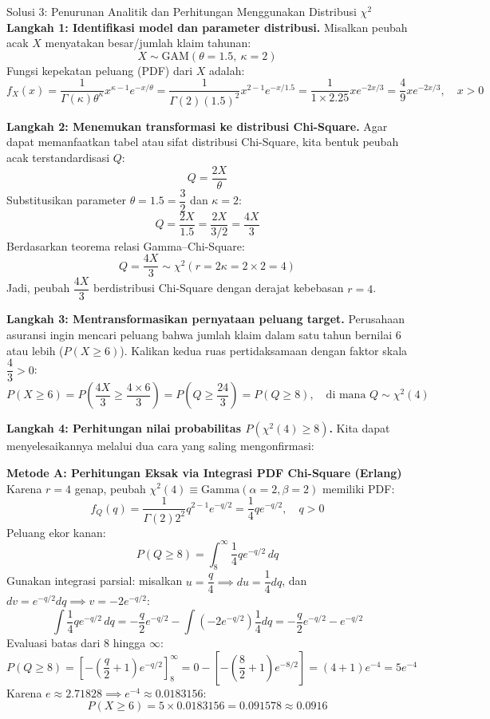 \documentclass[10pt,twoside]{article}
\begin{document}
\begin{solbox}{Solusi 3: Penurunan Analitik dan Perhitungan Menggunakan Distribusi $\chi^2$}
\textbf{Langkah 1: Identifikasi model dan parameter distribusi.}
Misalkan peubah acak $X$ menyatakan besar/jumlah klaim tahunan:
\[
X \sim \text{GAM}(\theta = 1.5, \ \kappa = 2)
\]
Fungsi kepekatan peluang (PDF) dari $X$ adalah:
\[
f_X(x) = \frac{1}{\Gamma(\kappa) \theta^\kappa} x^{\kappa - 1} e^{-x/\theta} = \frac{1}{\Gamma(2) (1.5)^2} x^{2-1} e^{-x/1.5} = \frac{1}{1 \times 2.25} x e^{-2x/3} = \frac{4}{9} x e^{-2x/3}, \quad x > 0
\]

\textbf{Langkah 2: Menemukan transformasi ke distribusi Chi-Square.}
Agar dapat memanfaatkan tabel atau sifat distribusi Chi-Square, kita bentuk peubah acak terstandardisasi $Q$:
\[
Q = \frac{2X}{\theta}
\]
Substitusikan parameter $\theta = 1.5 = \dfrac{3}{2}$ dan $\kappa = 2$:
\[
Q = \frac{2X}{1.5} = \frac{2X}{3/2} = \frac{4X}{3}
\]
Berdasarkan teorema relasi Gamma--Chi-Square:
\[
Q = \frac{4X}{3} \sim \chi^2(r = 2\kappa = 2 \times 2 = 4)
\]
Jadi, peubah $\dfrac{4X}{3}$ berdistribusi Chi-Square dengan derajat kebebasan $r = 4$.

\textbf{Langkah 3: Mentransformasikan pernyataan peluang target.}
Perusahaan asuransi ingin mencari peluang bahwa jumlah klaim dalam satu tahun bernilai 6 atau lebih ($P(X \ge 6)$).
Kalikan kedua ruas pertidaksamaan dengan faktor skala $\dfrac{4}{3} > 0$:
\[
P(X \ge 6) = P\left(\frac{4X}{3} \ge \frac{4 \times 6}{3}\right) = P\left(Q \ge \frac{24}{3}\right) = P(Q \ge 8), \quad \text{di mana } Q \sim \chi^2(4)
\]

\textbf{Langkah 4: Perhitungan nilai probabilitas $P(\chi^2(4) \ge 8)$.}
Kita dapat menyelesaikannya melalui dua cara yang saling mengonfirmasi:

\textbf{Metode A: Perhitungan Eksak via Integrasi PDF Chi-Square (Erlang)}
Karena $r = 4$ genap, peubah $\chi^2(4) \equiv \text{Gamma}(\alpha = 2, \beta = 2)$ memiliki PDF:
\[
f_Q(q) = \frac{1}{\Gamma(2) 2^2} q^{2-1} e^{-q/2} = \frac{1}{4} q e^{-q/2}, \quad q > 0
\]
Peluang ekor kanan:
\[
P(Q \ge 8) = \int_8^\infty \frac{1}{4} q e^{-q/2} \, dq
\]
Gunakan integrasi parsial: misalkan $u = \dfrac{q}{4} \implies du = \dfrac{1}{4} dq$, dan $dv = e^{-q/2} dq \implies v = -2e^{-q/2}$:
\[
\int \frac{1}{4} q e^{-q/2} \, dq = -\frac{q}{2} e^{-q/2} - \int \left(-2e^{-q/2}\right) \frac{1}{4} dq = -\frac{q}{2} e^{-q/2} - e^{-q/2}
\]
Evaluasi batas dari 8 hingga $\infty$:
\[
P(Q \ge 8) = \left[-\left(\frac{q}{2} + 1\right) e^{-q/2}\right]_8^\infty = 0 - \left[-\left(\frac{8}{2} + 1\right) e^{-8/2}\right] = (4 + 1) e^{-4} = 5 e^{-4}
\]
Karena $e \approx 2.71828 \implies e^{-4} \approx 0.0183156$:
\[
P(X \ge 6) = 5 \times 0.0183156 = 0.091578 \approx \mathbf{0.0916}
\]


\end{solbox}
\end{document}
